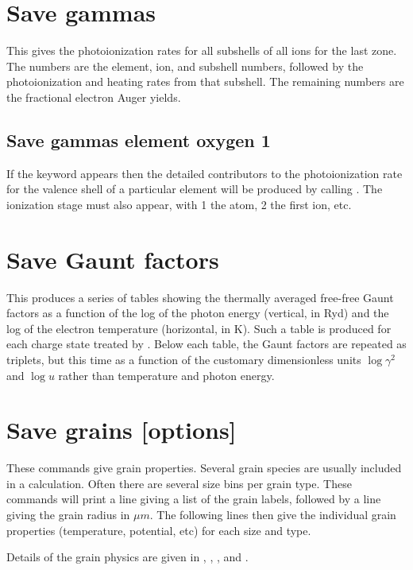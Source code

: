 \section{Save gammas}

This gives the photoionization rates for all subshells of all ions for
the last zone.  The numbers are the element, ion, and subshell numbers,
followed by the photoionization and heating rates from that subshell.  The
remaining numbers are the fractional electron Auger yields.

\subsection{Save gammas element oxygen 1}

If the  keyword appears then the detailed contributors to the
photoionization rate for the valence shell of a particular element will
be produced by calling .
The ionization stage must also appear,
with 1 the atom, 2 the first ion, etc.

\section{Save Gaunt factors}

This produces a series of tables showing the thermally averaged free-free
Gaunt factors as a function of the log of the photon energy (vertical, in Ryd)
and the log of the electron temperature (horizontal, in K). Such a table is
produced for each charge state treated by \Cloudy. Below each table, the Gaunt
factors are repeated as triplets, but this time as a function of the customary
dimensionless units $\log \gamma^2$ and $\log u$ rather than temperature and
photon energy.

\section{Save grains [options]}

These commands give grain properties.  Several grain species are usually
included in a calculation.   Often there are several size bins per grain
type.  These commands will print a line giving a list of the grain labels,
followed by a line giving the grain radius in $\mu m$.
The following lines then give the individual grain properties
(temperature, potential, etc) for each size and type.

Details of the grain physics are given in \citet{Baldwin1991},
\citet{Weingartner2001a},
\citet{VanHoof2004}, and \citet{Weingartner2006}.

